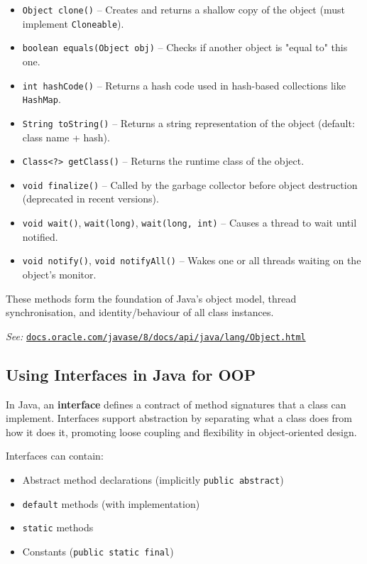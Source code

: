 \documentclass{article}
\begin{document}
\begin{itemize}
    \item \texttt{Object clone()} – Creates and returns a shallow copy of the object (must implement \texttt{Cloneable}).
    \item \texttt{boolean equals(Object obj)} – Checks if another object is "equal to" this one.
    \item \texttt{int hashCode()} – Returns a hash code used in hash-based collections like \texttt{HashMap}.
    \item \texttt{String toString()} – Returns a string representation of the object (default: class name + hash).
    \item \texttt{Class<?> getClass()} – Returns the runtime class of the object.
    \item \texttt{void finalize()} – Called by the garbage collector before object destruction (deprecated in recent versions).
    \item \texttt{void wait()}, \texttt{wait(long)}, \texttt{wait(long, int)} – Causes a thread to wait until notified.
    \item \texttt{void notify()}, \texttt{void notifyAll()} – Wakes one or all threads waiting on the object’s monitor.
\end{itemize}

These methods form the foundation of Java’s object model, thread synchronisation, and identity/behaviour of all class instances.

\smallskip
\textit{See:} \href{https://docs.oracle.com/javase/8/docs/api/java/lang/Object.html}{\texttt{docs.oracle.com/javase/8/docs/api/java/lang/Object.html}}

\subsection{Using Interfaces in Java for OOP}

In Java, an \textbf{interface} defines a contract of method signatures that a class can implement. Interfaces support abstraction by separating what a class does from how it does it, promoting loose coupling and flexibility in object-oriented design.

Interfaces can contain:
\begin{itemize}
    \item Abstract method declarations (implicitly \texttt{public abstract})
    \item \texttt{default} methods (with implementation)
    \item \texttt{static} methods
    \item Constants (\texttt{public static final})
\end{itemize}
\end{document}
